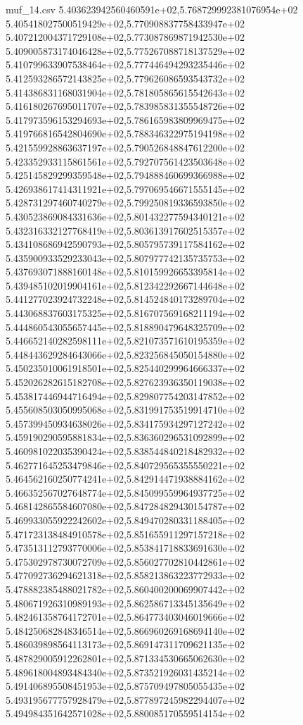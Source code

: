 \begin{filecontents*}{muf_14.csv}
5.403623942560460591e+02,5.768729992381076954e+02
5.405418027500519429e+02,5.770908837758433947e+02
5.407212004371729108e+02,5.773087869871942530e+02
5.409005873174046428e+02,5.775267088718137529e+02
5.410799633907538464e+02,5.777446494293235446e+02
5.412593286572143825e+02,5.779626086593543732e+02
5.414386831168031904e+02,5.781805865615542643e+02
5.416180267695011707e+02,5.783985831355548726e+02
5.417973596153294693e+02,5.786165983809969475e+02
5.419766816542804690e+02,5.788346322975194198e+02
5.421559928863637197e+02,5.790526848847612200e+02
5.423352933115861561e+02,5.792707561423503648e+02
5.425145829299359548e+02,5.794888460699366988e+02
5.426938617414311921e+02,5.797069546671555145e+02
5.428731297460740279e+02,5.799250819336593850e+02
5.430523869084331636e+02,5.801432277594340121e+02
5.432316332127768419e+02,5.803613917602515357e+02
5.434108686942590793e+02,5.805795739117584162e+02
5.435900933529233043e+02,5.807977742135735753e+02
5.437693071888160148e+02,5.810159926653395814e+02
5.439485102019904161e+02,5.812342292667144648e+02
5.441277023924732248e+02,5.814524840173289704e+02
5.443068837603175325e+02,5.816707569168211194e+02
5.444860543055657445e+02,5.818890479648325709e+02
5.446652140282598111e+02,5.821073571610195359e+02
5.448443629284643066e+02,5.823256845050154880e+02
5.450235010061918501e+02,5.825440299964666337e+02
5.452026282615182708e+02,5.827623936350119038e+02
5.453817446944716494e+02,5.829807754203147852e+02
5.455608503050995068e+02,5.831991753519914710e+02
5.457399450934638026e+02,5.834175934297127242e+02
5.459190290595881834e+02,5.836360296531092899e+02
5.460981022035390424e+02,5.838544840218482932e+02
5.462771645253479846e+02,5.840729565355550221e+02
5.464562160250774241e+02,5.842914471938884162e+02
5.466352567027648774e+02,5.845099559964937725e+02
5.468142865584607080e+02,5.847284829430154787e+02
5.469933055922242602e+02,5.849470280331188405e+02
5.471723138484910578e+02,5.851655911297157218e+02
5.473513112793770006e+02,5.853841718833691630e+02
5.475302978730072709e+02,5.856027702810442861e+02
5.477092736294621318e+02,5.858213863223772933e+02
5.478882385488021782e+02,5.860400200069907442e+02
5.480671926310989193e+02,5.862586713345135649e+02
5.482461358764172701e+02,5.864773403046019666e+02
5.484250682848346514e+02,5.866960269168694140e+02
5.486039898564113173e+02,5.869147311709621135e+02
5.487829005912262801e+02,5.871334530665062630e+02
5.489618004893484340e+02,5.873521926031435214e+02
5.491406895508451953e+02,5.875709497805055435e+02
5.493195677757928479e+02,5.877897245982294407e+02
5.494984351642571028e+02,5.880085170559514154e+02

\end{filecontents*}
